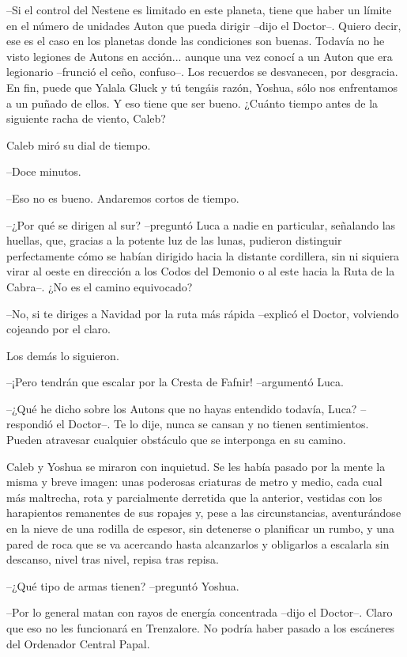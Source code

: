 --Si el control del Nestene es limitado en este planeta, tiene que haber un límite en el número de unidades Auton que pueda dirigir --dijo el Doctor--. Quiero decir, ese es el caso en los planetas donde las condiciones son buenas. Todavía no he visto legiones de Autons en acción... aunque una vez conocí a un Auton que era legionario --frunció el ceño, confuso--. Los recuerdos se desvanecen, por desgracia. En fin, puede que Yalala Gluck y tú tengáis razón, Yoshua, sólo nos enfrentamos a un puñado de ellos. Y eso tiene que ser bueno. ¿Cuánto tiempo antes de la siguiente racha de viento, Caleb?
 
Caleb miró su dial de tiempo.
 
--Doce minutos.
 
--Eso no es bueno. Andaremos cortos de tiempo.
 
--¿Por qué se dirigen al sur? --preguntó Luca a nadie en particular, señalando las huellas, que, gracias a la potente luz de las lunas, pudieron distinguir perfectamente cómo se habían dirigido hacia la distante cordillera, sin ni siquiera virar al oeste en dirección a los Codos del Demonio o al este hacia la Ruta de la Cabra--. ¿No es el camino equivocado?
 
--No, si te diriges a Navidad por la ruta más rápida --explicó el Doctor, volviendo cojeando por el claro.
 
Los demás lo siguieron.
 
--¡Pero tendrán que escalar por la Cresta de Fafnir! --argumentó Luca.
 
--¿Qué he dicho sobre los Autons que no hayas entendido todavía, Luca? --respondió el Doctor--. Te lo dije, nunca se cansan y no tienen sentimientos. Pueden atravesar cualquier obstáculo que se interponga en su camino.
 
Caleb y Yoshua se miraron con inquietud. Se les había pasado por la mente la misma y breve imagen: unas poderosas criaturas de metro y medio, cada cual más maltrecha, rota y parcialmente derretida que la anterior, vestidas con los harapientos remanentes de sus ropajes y, pese a las circunstancias, aventurándose en la nieve de una rodilla de espesor, sin detenerse o planificar un rumbo, y una pared de roca que se va acercando hasta alcanzarlos y obligarlos a escalarla sin descanso, nivel tras nivel, repisa tras repisa.
 
--¿Qué tipo de armas tienen? --preguntó Yoshua.
 
--Por lo general matan con rayos de energía concentrada --dijo el Doctor--. Claro que eso no les funcionará en Trenzalore. No podría haber pasado a los escáneres del Ordenador Central Papal.
 
